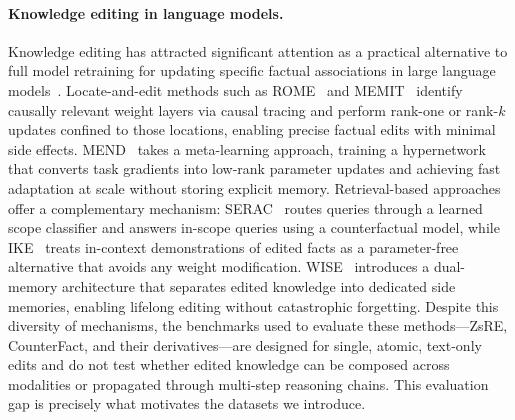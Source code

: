 \documentclass{article}
\begin{document}
\paragraph{Knowledge editing in language models.}
Knowledge editing has attracted significant attention as a practical alternative to full model retraining for updating specific factual associations in large language models~\cite{editing23,KE_24survey,easyedit24}. Locate-and-edit methods such as ROME~\cite{rome22} and MEMIT~\cite{memit23} identify causally relevant weight layers via causal tracing and perform rank-one or rank-$k$ updates confined to those locations, enabling precise factual edits with minimal side effects. MEND~\cite{mend22} takes a meta-learning approach, training a hypernetwork that converts task gradients into low-rank parameter updates and achieving fast adaptation at scale without storing explicit memory. Retrieval-based approaches offer a complementary mechanism: SERAC~\cite{serac22} routes queries through a learned scope classifier and answers in-scope queries using a counterfactual model, while IKE~\cite{ike23} treats in-context demonstrations of edited facts as a parameter-free alternative that avoids any weight modification. WISE~\cite{wise24} introduces a dual-memory architecture that separates edited knowledge into dedicated side memories, enabling lifelong editing without catastrophic forgetting. Despite this diversity of mechanisms, the benchmarks used to evaluate these methods---ZsRE, CounterFact, and their derivatives---are designed for single, atomic, text-only edits and do not test whether edited knowledge can be composed across modalities or propagated through multi-step reasoning chains. This evaluation gap is precisely what motivates the datasets we introduce.
\end{document}
